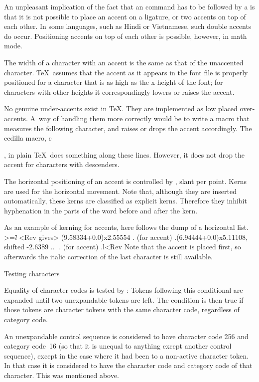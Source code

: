 {An unpleasant implication of the fact that an  command
has to be followed by a  is that it is not
possible to place an accent on a ligature, or
two accents on top of each other.
In some languages, such as Hindi or Vietnamese,
such double accents do occur.
Positioning accents on top of each other is possible,
however, in math mode.

The width of a character with an accent is the same as that of
the unaccented character. \TeX\ assumes that the 
accent as it appears in the font file
is properly positioned for a character that is as high
as the x-height of the font; for characters with other heights
it correspondingly lowers or raises the accent.

No genuine under-accents exist in \TeX. They are
implemented as low placed over-accents. A~way of handling
them more correctly would be to write a macro that
measures the following character, and raises or drops
the accent accordingly.
The cedilla macro, \csterm c\par,
in plain \TeX\ does something along these lines. However,
it does not drop the accent for characters with descenders.

The horizontal positioning of an accent is controlled by
, slant per point. Kerns are used
for the horizontal movement. Note that, although they
are inserted automatically, these kerns are classified
as {\italic explicit\/} kerns. Therefore they inhibit hyphenation
in the parts of the word before and after the kern.

As an example of kerning for accents, 
here follows the dump of a horizontal list.
\Ver>=\hbox{\it \`l}
<Rev
gives\Ver>
\hbox(9.58334+0.0)x2.55554
. (for accent)
.\hbox(6.94444+0.0)x5.11108, shifted -2.6389
..\tenit ^^R
. (for accent)
.\tenit l<Rev
Note that the accent is placed first, so afterwards the italic
correction of the last character is still available.
\awp

\point Testing characters

Equality of character codes is tested by :
\disp{}\dispstop
Tokens following this conditional are expanded until two
unexpandable tokens are left. The condition is then true
if those tokens are character tokens with the same character
code, regardless of category code. 

An unexpandable control
sequence is considered to have character code 256 and
category code~16 (so that it is unequal to anything except
another control sequence), except in the case
where it had been  to a non-active character token.
In that case it is considered to have the character code
and category code of that character. This was mentioned above.

}
